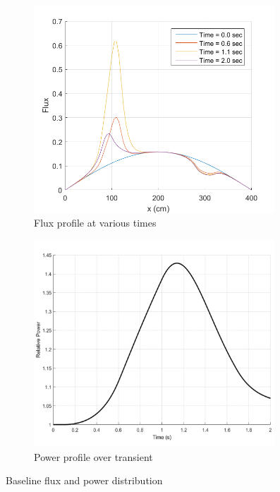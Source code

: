 \documentclass{elsarticle}
\begin{document}
\begin{figure}[!htbp]
\centering
\begin{subfigure}[b]{0.49\textwidth}
\centering
\includegraphics[width=0.99\textwidth]{figures/1D_flux.png}
\caption{Flux profile at various times}
\label{fig:1D_flux}
\end{subfigure}
\begin{subfigure}[b]{0.49\textwidth}
\centering
\includegraphics[width=0.99\textwidth]{figures/1D_power_base.png}
\caption{Power profile over transient}
\label{fig:1D_tot_power}
\end{subfigure}
\caption{Baseline flux and power distribution}
\label{fig:1D}
\end{figure}
\end{document}
